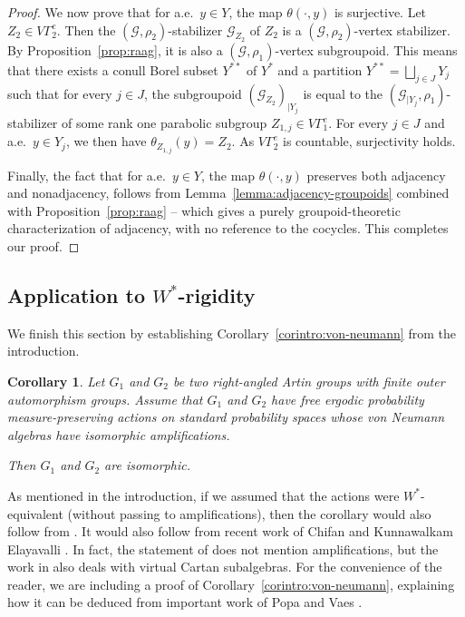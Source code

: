 \documentclass[JEP,XML,SOM,Unicode,NoFloatCountersInSection,published]{cedram}
\let\mathcal\mathscr
\theoremstyle{plain}
\newtheorem{cor}[theo]{Corollary}
\theoremstyle{definition}
\let\Dunion\bigsqcup
\newcommand{\calg}{\mathcal{G}}
\begin{document}
\begin{proof}
We now prove that for a.e.\ $y\in Y$, the map $\theta(\cdot,y)$ is surjective. Let $Z_2\in V\Gamma^e_2$. Then the $(\calg,\rho_2)$-stabilizer $\calg_{Z_2}$ of $Z_2$ is a $(\calg,\rho_2)$-vertex stabilizer. By Proposition~\ref{prop:raag}, it is also a $(\calg,\rho_1)$-vertex subgroupoid. This means that there exists a conull Borel subset $Y^{**}$ of $Y^*$ and a partition $Y^{**}=\Dunion_{j\in J} Y_j$ such that for every $j\in J$, the subgroupoid $(\calg_{Z_2})_{|Y_j}$ is equal to the $(\calg_{|Y_j},\rho_1)$-stabilizer of some rank one parabolic subgroup $Z_{1,j}\in V\Gamma_1^e$. For every $j\in J$ and a.e.\ $y\in Y_j$, we then have $\theta_{Z_{1,j}}(y)=Z_2$. As $V\Gamma_2^e$ is countable, surjectivity holds.

Finally, the fact that for a.e.\ $y\in Y$, the map $\theta(\cdot,y)$ preserves both adjacency and nonadjacency, follows from Lemma~\ref{lemma:adjacency-groupoids} combined with Proposition~\ref{prop:raag} -- which gives a purely groupoid-theoretic characterization of adjacency, with no reference to the cocycles. This completes our proof.
\end{proof}

\subsection{Application to $W^*$-rigidity}\label{sec:von-neumann}

We finish this section by establishing Corollary~\ref{corintro:von-neumann} from the introduction.

\begin{cor}
\label{cor:von-neumann}
Let $G_1$ and $G_2$ be two right-angled Artin groups with finite outer automorphism groups. Assume that $G_1$ and $G_2$ have free ergodic probability measure-preserving actions on standard probability spaces whose von Neumann algebras have isomorphic amplifications.

Then $G_1$ and $G_2$ are isomorphic.
\end{cor}

As mentioned in the introduction, if we assumed that the actions were $W^*$\nobreakdash-equi\-valent (without passing to amplifications), then the corollary would also follow from \cite[Cor.\,4.2]{HHL}. It would also follow from recent work of Chifan and Kunnawalkam Elayavalli \cite[Th.\,1.3]{CE}. In fact, the statement of \cite[Th.\,1.3]{CE} does not mention amplifications, but the work in \cite[Th.\,3.1]{CE} also deals with virtual Cartan subalgebras. For the convenience of the reader, we are including a proof of Corollary~\ref{corintro:von-neumann}, explaining how it can be deduced from important work of Popa and Vaes \cite{PV1}.
\end{document}
